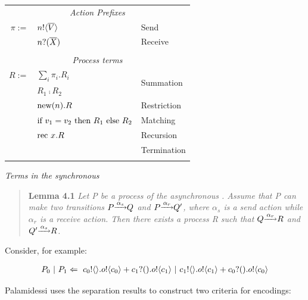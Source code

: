 \documentclass[12pt,twoside]{reedthesis}
\begin{document}
		\begin{insettable}
		\begin{center}
		\begin{tabular}{r l l}
		\multicolumn{3}{c}{\emph{Action Prefixes}}\\
		$\pi :=$  & ${n}!\langle{ \ensuremath{\overline{V}} }\rangle$ & Send\\
		&${n}?({\overline{X}})$ & Receive\\

		&\\

		\multicolumn{3}{c}{\emph{Process terms}}\\
		$R :=$ & $\displaystyle\sum_{i} \pi_i.R_i$ &\multirow{2}{*}{Summation}\\[20pt]
		&$R_1 \comp R_2$ & Composition\\
		&$\text{new}({n}).R$ & Restriction\\
		&$\text{if } {v_1 = v_2}\text{ then } R_1 \text{ else } R_2$ & Matching\\
		&$\text{rec }{x}. R$ & Recursion\\
		&\pstop & Termination\\
		&\\
		\end{tabular}
		\caption{\emph{Terms in the synchronous \picalc}}\label{spicalcterms}
		\end{center}
		\end{insettable}
		\newpage
		\null\vfil
	  
		\begin{quote}
			\textbf{Lemma 4.1} \emph{Let P be a process of the asynchronous \picalc.  Assume that P can make two transitions $P \overset{\underrightarrow{\ {\alpha_s}\ }}{} Q$ and $P \overset{\underrightarrow{\ {\alpha_r}\ }}{} Q'$, where $\alpha_s$ is a send action while $\alpha_r$ is a receive action.  Then there exists a process R such that $Q \overset{\underrightarrow{\ {\alpha_r}\ }}{} R$ and $Q' \overset{\underrightarrow{\ {\alpha_s}\ }}{} R$.}
		\end{quote}
		\centering Consider, for example:
		
		\begin{align*}
			P_0\ |\  P_1 \Leftarrow\  {c_0}!\langle{}\rangle. {o}!\langle{c_0}\rangle + {c_1}?({}). {o}!\langle{c_1}\rangle \ |\  {c_1}!\langle{}\rangle. {o}!\langle{c_1}\rangle + {c_0}?({}). {o}!\langle{c_0}\rangle
		\end{align*}
		
		\newpage
		\null\vfil
	  
		\centering Palamidessi uses the separation results to construct two criteria for encodings:\\[20pt]
\end{document}

